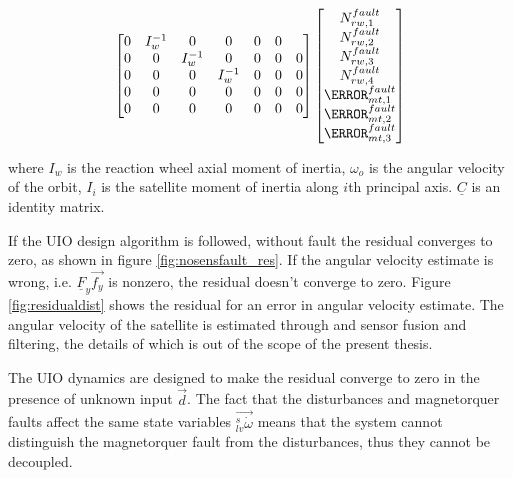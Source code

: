 \begin{align}
\begin{bmatrix}
 0 & I_w^{-1} & 0 & 0 & 0 & 0 \\ 
 0 & 0 & I_w^{-1} & 0& 0 & 0 & 0 \\  
 0 & 0 & 0 & I_w^{-1} & 0 & 0 & 0 \\
 0 & 0 & 0 & 0 & 0 & 0& 0 \\
 0 & 0 & 0 & 0 & 0& 0 & 0 \\
 \end{bmatrix}
 \begin{bmatrix}
 N^{fault}_{rw,1} \\
 N^{fault}_{rw,2} \\
 N^{fault}_{rw,3}\\
 N^{fault}_{rw,4}\\
 \m^{fault}_{mt,1} \\
 \m^{fault}_{mt,2} \\
 \m^{fault}_{mt,3} 
 \end{bmatrix}
\label{eq:uioMatrices}
\end{align}
\normalsize

where $I_w$ is the reaction wheel axial moment of inertia, $\omega_o$ is the angular velocity of the orbit, $I_i$ is the satellite moment of inertia along $i$th principal axis. $\underline{C}$ is an identity matrix. 

If the UIO design algorithm is followed, without fault the residual converges to zero, as shown in figure \ref{fig:nosensfault_res}. If the angular velocity estimate is wrong, i.e. $\underline{F}_y \vec{f_y}$ is nonzero, the residual doesn't converge to zero. Figure \ref{fig:residualdist} shows the residual for an error in angular velocity estimate. The angular velocity of the satellite is estimated through and sensor fusion and filtering, the details of which is out of the scope of the present thesis.

The UIO dynamics are designed to make the residual converge to zero in the presence of unknown input $\vec{d}$. The fact that the disturbances and magnetorquer faults affect the same state variables $\vec{_{lv}^s\dot{\omega}}$ means that the system cannot distinguish the magnetorquer fault from the disturbances, thus they cannot be decoupled.

